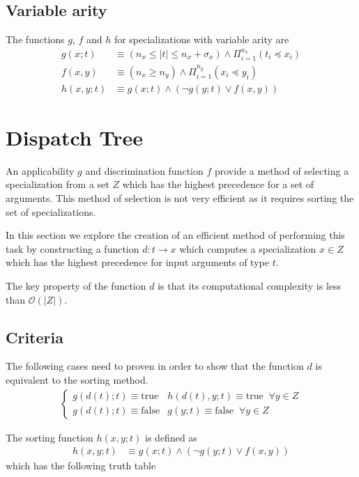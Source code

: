 \documentclass{article}
\newcommand{\true}{\textrm{true}}
\newcommand{\false}{\textrm{false}}
\begin{document}
\subsection{Variable arity}
The functions $g$, $f$ and $h$ for specializations with variable arity
are
\begin{align}
  g(x;t) &\equiv (n_x \leq |t| \leq n_x + \sigma_x) \land \Pi_{i=1}^{n_x} (t_i \preceq x_i) \\
  f(x,y) &\equiv (n_x \geq n_y) \land \Pi_{i=1}^{n_y}(x_i \preceq y_i) \\
  h(x,y;t) &\equiv g(x;t) \land (\lnot g(y;t) \lor f(x,y) )
\end{align}

\section{Dispatch Tree}
An applicability $g$ and discrimination function $f$ provide a method
of selecting a specialization from a set $Z$ which has the highest
precedence for a set of arguments. This method of selection is not
very efficient as it requires sorting the set of
specializations.

In this section we explore the creation of an efficient method of
performing this task by constructing a function $d : t \rightarrow x$
which computes a specialization $x \in Z$ which has the highest
precedence for input arguments of type $t$.

The key property of the function $d$ is that its computational
complexity is less than $\mathcal{O}(|Z|)$.

\subsection{Criteria}
The following cases need to proven in order to show that the function
$d$ is equivalent to the sorting method.
\begin{align}
  \begin{cases}
    g(d(t); t) \equiv \true & h(d(t),y;t) \equiv \true \;\; \forall y \in Z \\
    g(d(t); t) \equiv \false & g(y;t) \equiv \false \;\; \forall y \in Z
  \end{cases}
\end{align}

\noindent The sorting function $h(x,y;t)$ is defined as
\begin{align}
  h(x,y;t) &\equiv g(x;t) \land (\lnot g(y;t) \lor f(x,y) )
\end{align}
which has the following truth table
\end{document}
